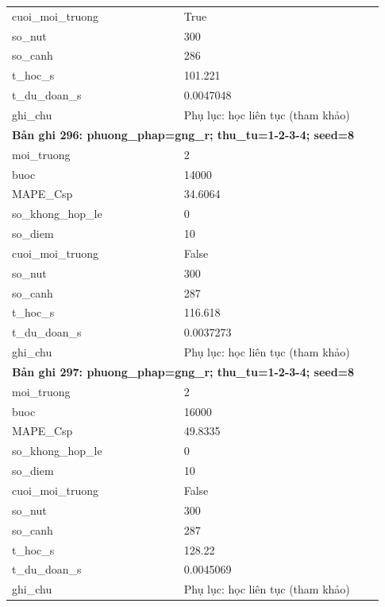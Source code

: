 \begin{longtable}{p{0.43\linewidth}p{0.50\linewidth}}
cuoi\_\allowbreak moi\_\allowbreak truong & True \\
so\_\allowbreak nut & 300 \\
so\_\allowbreak canh & 286 \\
t\_\allowbreak hoc\_\allowbreak s & 101.221 \\
t\_\allowbreak du\_\allowbreak doan\_\allowbreak s & 0.0047048 \\
ghi\_\allowbreak chu & Phụ lục: học liên tục (tham khảo) \\
\midrule
\multicolumn{2}{p{0.95\linewidth}}{\textbf{Bản ghi 296: phuong\_phap=gng\_r; thu\_tu=1-2-3-4; seed=8}} \\
moi\_\allowbreak truong & 2 \\
buoc & 14000 \\
MAPE\_\allowbreak Csp & 34.6064 \\
so\_\allowbreak khong\_\allowbreak hop\_\allowbreak le & 0 \\
so\_\allowbreak diem & 10 \\
cuoi\_\allowbreak moi\_\allowbreak truong & False \\
so\_\allowbreak nut & 300 \\
so\_\allowbreak canh & 287 \\
t\_\allowbreak hoc\_\allowbreak s & 116.618 \\
t\_\allowbreak du\_\allowbreak doan\_\allowbreak s & 0.0037273 \\
ghi\_\allowbreak chu & Phụ lục: học liên tục (tham khảo) \\
\midrule
\multicolumn{2}{p{0.95\linewidth}}{\textbf{Bản ghi 297: phuong\_phap=gng\_r; thu\_tu=1-2-3-4; seed=8}} \\
moi\_\allowbreak truong & 2 \\
buoc & 16000 \\
MAPE\_\allowbreak Csp & 49.8335 \\
so\_\allowbreak khong\_\allowbreak hop\_\allowbreak le & 0 \\
so\_\allowbreak diem & 10 \\
cuoi\_\allowbreak moi\_\allowbreak truong & False \\
so\_\allowbreak nut & 300 \\
so\_\allowbreak canh & 287 \\
t\_\allowbreak hoc\_\allowbreak s & 128.22 \\
t\_\allowbreak du\_\allowbreak doan\_\allowbreak s & 0.0045069 \\
ghi\_\allowbreak chu & Phụ lục: học liên tục (tham khảo) \\

\end{longtable}

